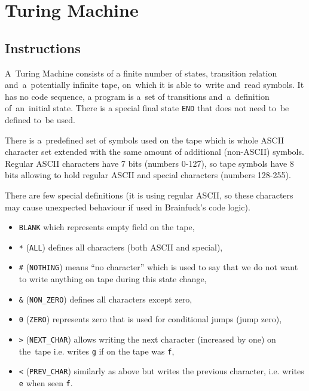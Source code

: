 \documentclass[english,shortabstract,mgr]{iithesis}
\begin{document}
\section {Turing Machine} \label{turing_machine}

\subsection {Instructions}

A~Turing Machine consists of a finite number of states, transition relation
and~a~potentially infinite tape, on~which it is able to~write and~read symbols.
It has no code sequence, a program is a~set of transitions and~a~definition
of~an~initial state. There is a special final state \texttt{END} that does not need
to~be defined to~be used.

There is a~predefined set of symbols used on the tape which is whole ASCII character set
extended with the same amount of additional (non-ASCII) symbols. Regular
ASCII characters have 7 bits (numbers 0-127), so tape symbols have 8 bits
allowing to hold regular ASCII and special characters (numbers 128-255).

        There are few special definitions (it is using regular ASCII, so
these characters may cause unexpected behaviour if used in Brainfuck's
code logic).

\begin{itemize}
  \item \texttt{BLANK} which represents empty field on the tape,
  \item \texttt{*} (\texttt{ALL}) defines all characters (both ASCII and special),
  \item \texttt{\#} (\texttt{NOTHING}) means ``no character'' which is used to say
                   that we do not want to write anything on tape during
                   this state change,
          \item \texttt{\&} (\texttt{NON\_ZERO}) defines all characters except zero,
          \item \texttt{0} (\texttt{ZERO}) represents zero that is used for conditional jumps
           (jump zero),
          \item \texttt{>} (\texttt{NEXT\_CHAR}) allows writing the next character
                   (increased by one) on the~tape i.e. writes \texttt{g}
                   if on the tape was \texttt{f},
  \item \texttt{<} (\texttt{PREV\_CHAR}) similarly as above but writes the previous character,
                   i.e. writes \texttt{e} when seen \texttt{f}.
\end{itemize}
\end{document}
